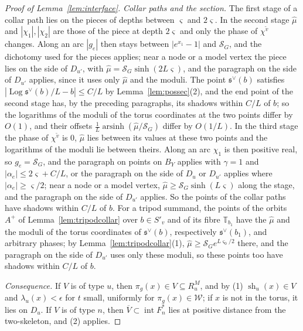 \begin{proof}[Proof of Lemma~\ref{lem:interface}]
\emph{Collar paths and the section.} The first stage of a collar path lies on the pieces of depths between $\varsigma$ and
$2\varsigma$. In the second stage $\hat\mu$ and $|\chi_1|,|\chi_2|$ are those of the piece at depth $2\varsigma$ and only the
phase of $\chi^{\tilde v}$ changes. Along an arc $|g_e|$ then stays between $|e^{x_1}-1|$ and $\mathcal S_G$, and the
dichotomy used for the pieces applies; near a node or a model vertex the piece lies on the side of $D_{u'}$, with
$\hat\mu=\mathcal S_G\sinh(2L\varsigma)$, and the paragraph on the side of $D_{u'}$ applies, since it uses only $\hat\mu$ and
the moduli. The point $\mathfrak s^\vee(b)$ satisfies $|\operatorname{Log}\mathfrak s^\vee(b)/L-b|\le C/L$ by
Lemma~\ref{lem:possec}(2), and the end point of the second stage has, by the preceding paragraphs, its shadows within $C/L$
of $b$; so the logarithms of the moduli of the torus coordinates at the two points differ by $O(1)$, and their offsets
$\frac1L\operatorname{arsinh}(\hat\mu/\mathcal S_G)$ differ by $O(1/L)$. In the third stage the phase of $\chi^{\tilde v}$ is
$0$, $\hat\mu$ lies between its values at these two points and the logarithms of the moduli lie between theirs. Along an
arc $\chi_1$ is then positive real, so $g_e=\mathcal S_G$, and the paragraph on points on $B_Y$ applies with $\gamma=1$ and
$|\alpha_e|\le2\varsigma+C/L$, or the paragraph on the side of $D_u$ or $D_{u'}$ applies where $|\alpha_e|\ge\varsigma/2$;
near a node or a model vertex, $\hat\mu\ge\mathcal S_G\sinh(L\varsigma)$ along the stage, and the paragraph on the side of
$D_{u'}$ applies. So the points of the collar paths have shadows within $C/L$ of $b$. For a tripod summand, the points of
the orbits $A^+$ of Lemma~\ref{lem:tripodcollar} over $b\in S'_v$ and of its fibre $\mathbb T_{b_1}$ have the $\hat\mu$ and
the moduli of the torus coordinates of $\mathfrak s^\vee(b)$, respectively $\mathfrak s^\vee(b_1)$, and arbitrary phases; by Lemma~\ref{lem:tripodcollar}(1),
$\hat\mu\ge\mathcal S_Ge^{L\varsigma_0/2}$ there, and the paragraph on the side of $D_{u'}$ uses only these moduli, so these
points too have shadows within $C/L$ of $b$.

\emph{Consequence.} If $V$ is of type $u$, then $\pi_g(x)\in V\subseteq R^M_u$, and by (1) $\operatorname{sh}_u(x)\in V$ and
$\lambda_u(x)<\epsilon$ for $t$ small, uniformly for $\pi_g(x)\in\mathcal W$; if $x$ is not in the torus, it lies on $D_u$. If
$V$ is of type $n$, then $\overline V\subset\operatorname{int}F^*_n$ lies at positive distance from the two-skeleton, and (2)
applies.
\end{proof}
